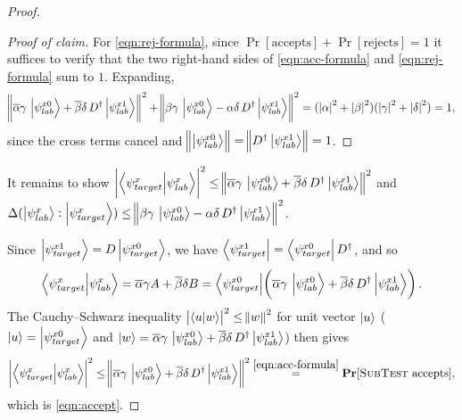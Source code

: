 \begin{proof}
\begin{proof}[Proof of claim]
For \eqref{eqn:rej-formula}, since $\Pr[\text{accepts}] + \Pr[\text{rejects}] = 1$ it suffices to verify that the two right-hand sides of \eqref{eqn:acc-formula} and \eqref{eqn:rej-formula} sum to $1$. Expanding,
\[
    \norm{\overline{\alpha}\gamma\,\ket{\psi_{lab}^{x0}} + \overline{\beta}\delta\,D^\dagger\ket{\psi_{lab}^{x1}}}^2 + \norm{\beta\gamma\,\ket{\psi_{lab}^{x0}} - \alpha\delta\,D^\dagger\ket{\psi_{lab}^{x1}}}^2 = ({\left| \alpha \right|}^2 + {\left| \beta \right|}^2)({\left| \gamma \right|}^2 + {\left| \delta \right|}^2) = 1,
\]
since the cross terms cancel and $\norm{\ket{\psi_{lab}^{x0}}} = \norm{D^\dagger\ket{\psi_{lab}^{x1}}} = 1$.
\end{proof}


It remains to show ${\left| \braket{\psi_{target}^x}{\psi_{lab}^x} \right|}^2 \leq \norm{\overline{\alpha}\gamma\,\ket{\psi_{lab}^{x0}} + \overline{\beta}\delta\,D^\dagger\ket{\psi_{lab}^{x1}}}^2$ 
and $\Delta(\ket{\psi_{lab}^x}:\ket{\psi_{target}^x}) \leq \norm{\beta\gamma\,\ket{\psi_{lab}^{x0}} - \alpha\delta\,D^\dagger\ket{\psi_{lab}^{x1}}}^2$.
\medskip

Since $\ket{\psi_{target}^{x1}} = D\ket{\psi_{target}^{x0}}$, we have $\bra{\psi_{target}^{x1}} = \bra{\psi_{target}^{x0}}D^\dagger$, and so
\[
    \braket{\psi_{target}^x}{\psi_{lab}^x} = \overline{\alpha}\gamma A + \overline{\beta}\delta B = \bra{\psi_{target}^{x0}}\!\left(\overline{\alpha}\gamma\,\ket{\psi_{lab}^{x0}} + \overline{\beta}\delta\,D^\dagger\ket{\psi_{lab}^{x1}}\right).
\]
The Cauchy--Schwarz inequality ${\left| \braket{u}{w} \right|}^2 \leq \norm{w}^2$ for unit vector $\ket{u}$ ($\ket{u} = \ket{\psi^{x0}_{target}}$ and $\ket{w} = \overline{\alpha}\gamma\,\ket{\psi_{lab}^{x0}} + \overline{\beta}\delta\,D^\dagger\ket{\psi_{lab}^{x1}}$) then gives
\[
    {\left| \braket{\psi_{target}^x}{\psi_{lab}^x} \right|}^2 \leq \norm{\overline{\alpha}\gamma\,\ket{\psi_{lab}^{x0}} + \overline{\beta}\delta\,D^\dagger\ket{\psi_{lab}^{x1}}}^2 \stackrel{\eqref{eqn:acc-formula}}{=} \operatorname{{\bf Pr}}[\textsc{SubTest}\text{ accepts}],
\]
which is \eqref{eqn:accept}.


\end{proof}
